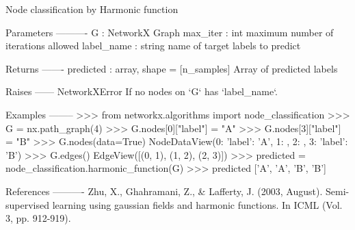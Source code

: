 \begin{DoxyVerb}Node classification by Harmonic function

Parameters
----------
G : NetworkX Graph
max_iter : int
    maximum number of iterations allowed
label_name : string
    name of target labels to predict

Returns
-------
predicted : array, shape = [n_samples]
    Array of predicted labels

Raises
------
NetworkXError
    If no nodes on `G` has `label_name`.

Examples
--------
>>> from networkx.algorithms import node_classification
>>> G = nx.path_graph(4)
>>> G.nodes[0]["label"] = "A"
>>> G.nodes[3]["label"] = "B"
>>> G.nodes(data=True)
NodeDataView({0: {'label': 'A'}, 1: {}, 2: {}, 3: {'label': 'B'}})
>>> G.edges()
EdgeView([(0, 1), (1, 2), (2, 3)])
>>> predicted = node_classification.harmonic_function(G)
>>> predicted
['A', 'A', 'B', 'B']

References
----------
Zhu, X., Ghahramani, Z., & Lafferty, J. (2003, August).
Semi-supervised learning using gaussian fields and harmonic functions.
In ICML (Vol. 3, pp. 912-919).
\end{DoxyVerb}
 